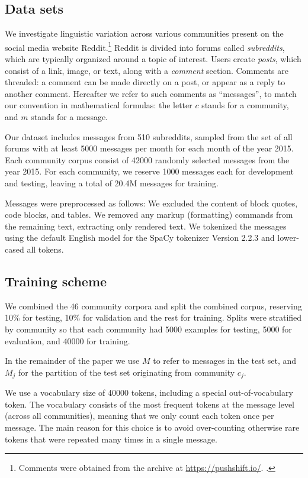 \documentclass[11pt]{article}
\begin{document}
\subsection{Data sets}

We investigate linguistic variation across various communities present
on the social media website Reddit.\footnote{Comments were obtained
  from the archive at \url{https://pushshift.io/}.
  \cite{Baumgartner2020}.}
%
Reddit is divided into forums called \textit{subreddits}, 
which are typically organized around a topic of interest. 
Users create \textit{posts}, which consist of a link, image, 
or text, along with a \emph{comment} section. 
Comments are threaded: a comment can be made directly on a post,
or appear as a reply to another comment.
%
Hereafter we refer to such comments as ``messages'', to match our
convention in mathematical formulas: the letter $c$ stands for a
community, and $m$ stands for a message.

Our dataset includes messages from \num{510} subreddits, 
sampled from the set of all forums 
with at least \num{5000} messages per month for each month
of the year 2015.
Each community corpus consist of \num{42000} randomly selected messages from the year 2015.
For each community, we reserve \num{1000} messages each for development and testing,
leaving a total of \num{20.4}M messages for training.

Messages were preprocessed as follows: 
We excluded the content of block quotes, code blocks, and tables.
We removed any markup (formatting) commands from the remaining text, extracting only rendered text.
We tokenized the messages using the default English model for the SpaCy tokenizer Version 2.2.3 \citep{Honnibal2017}
and lower-cased all tokens.

\subsection{Training scheme}

We combined the 46 community corpora and split the combined corpus,
reserving 10\% for testing, 10\% for validation and the rest for training.
Splits were stratified by community so that each community had \num{5000} examples
for testing, \num{5000} for evaluation, and \num{40000} for training.

In the remainder of the paper we use $M$ to refer to messages in the
test set, and $M_j$ for the partition of the test set originating from
community $c_j$.

We use a vocabulary size of \num{40000} tokens, including a special
out-of-vocabulary token.  The vocabulary consists of the most frequent
tokens at the message level (across all communities), meaning that we
only count each token once per message.  The main reason for this
choice is to avoid over-counting otherwise rare tokens that were
repeated many times in a single message.
\end{document}

